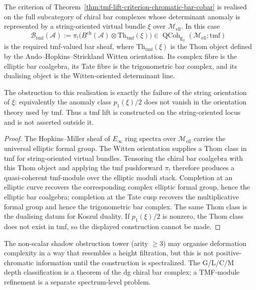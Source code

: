 \documentclass[11pt]{article}
\newcommand{\cA}{\mathcal{A}}
\newcommand{\Etwo}{\mathsf{E}_2}
\begin{document}
\begin{theorem}
\label{thm:string-oriented-tmf-realisation}
The criterion of Theorem~\ref{thm:tmf-lift-criterion-chromatic-bar-cobar}
is realised on the full subcategory of chiral bar complexes whose
determinant anomaly is represented by a string-oriented virtual
bundle $\xi$ over $\mathcal M_{\mathrm{ell}}$.  In this case
\[
  \mathscr B_{\mathrm{tmf}}(\cA)
  :=
  \pi_!\bigl(B^{\mathrm{ch}}(\cA)\otimes
  \mathrm{Th}_{\mathrm{tmf}}(\xi)\bigr)
  \in
  \operatorname{QCoh}_{\Etwo}(\mathcal M_{\mathrm{ell}};\mathrm{tmf})
\]
is the required tmf-valued bar sheaf, where
$\mathrm{Th}_{\mathrm{tmf}}(\xi)$ is the Thom object defined by the
Ando--Hopkins--Strickland Witten orientation.  Its complex fibre is
the elliptic bar coalgebra, its Tate fibre is the trigonometric
bar complex, and its dualising object is the Witten-oriented
determinant line.

The obstruction to this realisation is exactly the failure of the
string orientation of $\xi$: equivalently the anomaly class
$p_1(\xi)/2$ does not vanish in the orientation theory used by
$\mathrm{tmf}$.  Thus a tmf lift is constructed on the
string-oriented locus and is not asserted outside it.
\end{theorem}

\begin{proof}
The Hopkins--Miller sheaf of $E_\infty$ ring spectra over
$\mathcal M_{\mathrm{ell}}$ carries the universal elliptic formal
group.  The Witten orientation supplies a Thom class in tmf for
string-oriented virtual bundles.  Tensoring the chiral bar coalgebra
with this Thom object and applying the tmf pushforward $\pi_!$
therefore produces a quasi-coherent tmf-module over the elliptic
moduli stack.  Completion at an elliptic curve recovers the
corresponding complex elliptic formal group, hence the elliptic bar
coalgebra; completion at the Tate cusp recovers the multiplicative
formal group and hence the trigonometric bar complex.  The same
Thom class is the dualising datum for Koszul duality.  If
$p_1(\xi)/2$ is nonzero, the Thom class does not exist in tmf, so
the displayed construction cannot be made.
\end{proof}

\begin{remark}
The non-scalar shadow obstruction tower (arity $\geq 3$) may
organise deformation complexity in a way that resembles a
height filtration, but this is not positive-chromatic information
until the construction is spectralized.  The G/L/C/M depth
classification is a theorem of the dg chiral bar complex; a
TMF-module refinement is a separate spectrum-level problem.
\end{remark}
\end{document}
